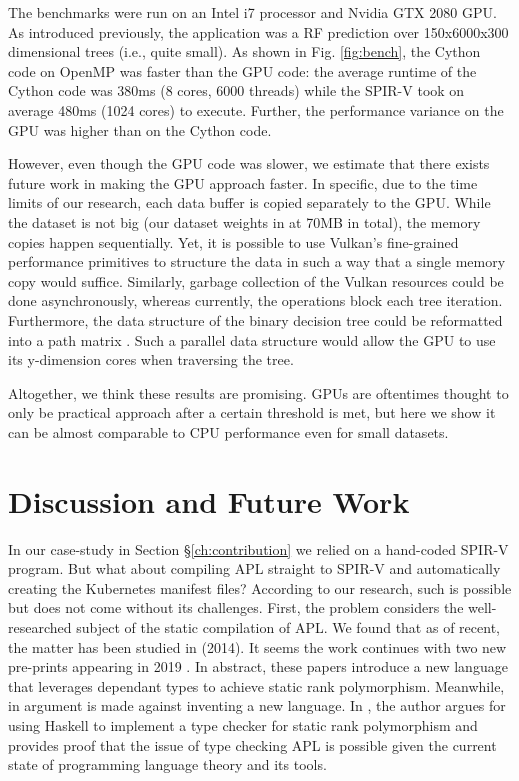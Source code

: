 \documentclass{IEEEtran}
\begin{document}
The benchmarks were run on an Intel i7 processor and Nvidia GTX 2080 GPU. As introduced previously, the application was a \gls{RF} prediction over 150x6000x300 dimensional trees (i.e., quite small). As shown in Fig. \ref{fig:bench}, the Cython code on OpenMP was faster than the GPU code: the average runtime of the Cython code was 380ms (8 cores, 6000 threads) while the SPIR-V took on average 480ms (1024 cores) to execute. Further, the performance variance on the GPU was higher than on the Cython code.

However, even though the GPU code was slower, we estimate that there exists future work in making the GPU approach faster. In specific, due to the time limits of our research, each data buffer is copied separately to the GPU. While the dataset is not big (our dataset weights in at 70MB in total), the memory copies happen sequentially. Yet, it is possible to use Vulkan's fine-grained performance primitives to structure the data in such a way that a single memory copy would suffice. Similarly, garbage collection of the Vulkan resources could be done asynchronously, whereas currently, the operations block each tree iteration. Furthermore, the data structure of the binary decision tree could be reformatted into a path matrix \cite{hsu2016key}. Such a parallel data structure would allow the GPU to use its y-dimension cores when traversing the tree.

Altogether, we think these results are promising. GPUs are oftentimes thought to only be practical approach after a certain threshold is met, but here we show it can be almost comparable to CPU performance even for small datasets.

\section{Discussion and Future Work}
\label{ch:dicussion}

In our case-study in Section §\ref{ch:contribution} we relied on a hand-coded SPIR-V program. But what about compiling APL straight to SPIR-V and automatically creating the Kubernetes manifest files? According to our research, such is possible but does not come without its challenges. First, the problem considers the well-researched subject of the static compilation of APL. We found that as of recent, the matter has been studied in \cite{slepak2014array} (2014). It seems the work continues with two new pre-prints appearing in 2019 \cite{slepak2019semantics, shivers2019introduction}. In abstract, these papers introduce a new language that leverages dependant types to achieve static rank polymorphism. Meanwhile, in \cite{gibbons2017aplicative} argument is made against inventing a new language. In \cite{gibbons2017aplicative}, the author argues for using Haskell to implement a type checker for static rank polymorphism and provides proof that the issue of type checking APL is possible given the current state of programming language theory and its tools.
\end{document}

